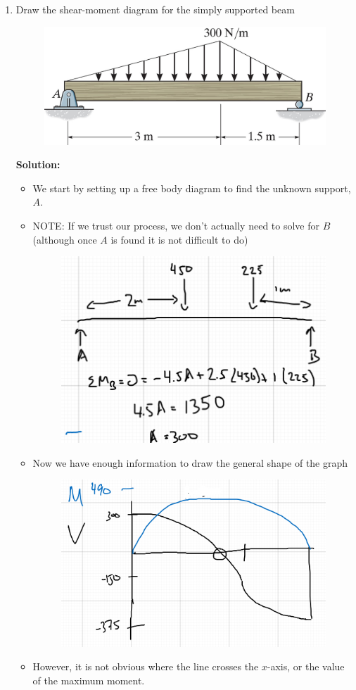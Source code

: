 \documentclass[12pt, oneside]{article}
\begin{document}
\begin{enumerate}
	\item %
		Draw the shear-moment diagram for the simply supported beam
		\begin{figure}[H]
			\centering
			\includegraphics[width=0.6\linewidth]{6-4}
		\end{figure}
		\textbf{Solution:}
		\begin{itemize}
			\item We start by setting up a free body diagram to find the unknown support, $A$.
			\item NOTE: If we trust our process, we don't actually need to solve for $B$ (although once $A$ is found it is not difficult to do)
				\begin{figure}[H]
					\centering
					\includegraphics[width=0.6\linewidth]{5-2a}
				\end{figure}
			\item Now we have enough information to draw the general shape of the graph
				\begin{figure}[H]
					\centering
					\includegraphics[width=0.6\linewidth]{5-2b}
				\end{figure}
			\item However, it is not obvious where the line crosses the $x$-axis, or the value of the maximum moment.

\end{itemize}
\end{enumerate}
\end{document}
